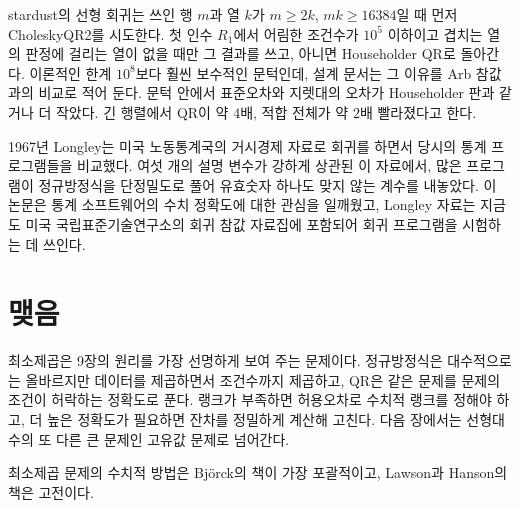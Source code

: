 \begin{instardust}
stardust의 선형 회귀는 쓰인 행 $m$과 열 $k$가 $m\ge2k$, $mk\ge16384$일 때 먼저 CholeskyQR2를 시도한다. 첫 인수 $R_1$에서 어림한 조건수가 $10^5$ 이하이고 겹치는 열의 판정에 걸리는 열이 없을 때만 그 결과를 쓰고, 아니면 Householder QR로 돌아간다. 이론적인 한계 $10^8$보다 훨씬 보수적인 문턱인데, 설계 문서는 그 이유를 Arb 참값과의 비교로 적어 둔다. 문턱 안에서 표준오차와 지렛대의 오차가 Householder 판과 같거나 더 작았다. 긴 행렬에서 QR이 약 $4$배, 적합 전체가 약 $2$배 빨라졌다고 한다.
\end{instardust}

\begin{aside}[Longley의 경고]
1967년 Longley는 미국 노동통계국의 거시경제 자료로 회귀를 하면서 당시의 통계 프로그램들을 비교했다. 여섯 개의 설명 변수가 강하게 상관된 이 자료에서, 많은 프로그램이 정규방정식을 단정밀도로 풀어 유효숫자 하나도 맞지 않는 계수를 내놓았다\cite{longley1967}. 이 논문은 통계 소프트웨어의 수치 정확도에 대한 관심을 일깨웠고, Longley 자료는 지금도 미국 국립표준기술연구소의 회귀 참값 자료집에 포함되어 회귀 프로그램을 시험하는 데 쓰인다\cite{nist-strd}.
\end{aside}

\section{맺음}

최소제곱은 9장의 원리를 가장 선명하게 보여 주는 문제이다. 정규방정식은 대수적으로는 올바르지만 데이터를 제곱하면서 조건수까지 제곱하고, QR은 같은 문제를 문제의 조건이 허락하는 정확도로 푼다. 랭크가 부족하면 허용오차로 수치적 랭크를 정해야 하고, 더 높은 정확도가 필요하면 잔차를 정밀하게 계산해 고친다. 다음 장에서는 선형대수의 또 다른 큰 문제인 고유값 문제로 넘어간다.

최소제곱 문제의 수치적 방법은 Björck의 책\cite{bjorck1996}이 가장 포괄적이고, Lawson과 Hanson의 책\cite{lawson1995}은 고전이다.

\chapterreferences
